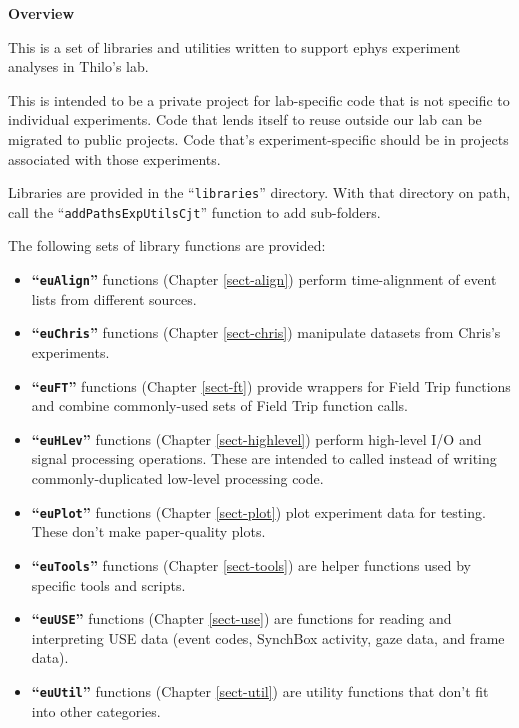 
\iffalse
%
\chapter{Overview}
%
\else
%
\vspace*{0.75in}
{\Huge \bfseries Overview}
\vspace*{\baselineskip}
\label{sect-over}
%
\fi

This is a set of libraries and utilities written to support ephys experiment
analyses in Thilo's lab.

This is intended to be a private project for lab-specific code that is not
specific to individual experiments. Code that lends itself to reuse outside
our lab can be migrated to public projects. Code that's experiment-specific
should be in projects associated with those experiments.

Libraries are provided in the ``\texttt{libraries}'' directory. With that
directory on path, call the \linebreak ``\texttt{addPathsExpUtilsCjt}''
function to add sub-folders.

The following sets of library functions are provided:
\begin{itemize}
%
\item \textbf{``\texttt{euAlign}''} functions (Chapter \ref{sect-align})
perform time-alignment of event lists from different sources.
%
\item \textbf{``\texttt{euChris}''} functions (Chapter \ref{sect-chris})
manipulate datasets from Chris's experiments.
%
\item \textbf{``\texttt{euFT}''} functions (Chapter \ref{sect-ft})
provide wrappers for Field Trip functions and combine commonly-used sets
of Field Trip function calls.
%
\item \textbf{``\texttt{euHLev}''} functions (Chapter \ref{sect-highlevel})
perform high-level I/O and signal processing operations. These are intended
to called instead of writing commonly-duplicated low-level processing code.
%
\item \textbf{``\texttt{euPlot}''} functions (Chapter \ref{sect-plot})
plot experiment data for testing. These don't make paper-quality plots.
%
\item \textbf{``\texttt{euTools}''} functions (Chapter \ref{sect-tools})
are helper functions used by specific tools and scripts.
%
\item \textbf{``\texttt{euUSE}''} functions (Chapter \ref{sect-use})
are functions for reading and interpreting USE data (event codes, SynchBox
activity, gaze data, and frame data).
%
\item \textbf{``\texttt{euUtil}''} functions (Chapter \ref{sect-util})
are utility functions that don't fit into other categories.
%
\end{itemize}

